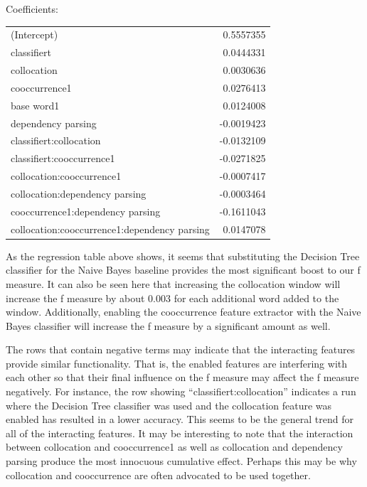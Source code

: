 \documentclass{article}
\begin{document}
Coefficients:

\begin{tabular}{l r}
                                (Intercept) & 0.5557355 \\
                                classifiert & 0.0444331  \\
                                 collocation & 0.0030636  \\
                              cooccurrence1 & 0.0276413 \\
                                 base word1 & 0.0124008  \\
                         dependency parsing & -0.0019423 \\
                     classifiert:collocation & -0.0132109 \\
                  classifiert:cooccurrence1 & -0.0271825 \\
                   collocation:cooccurrence1 & -0.0007417 \\
              collocation:dependency parsing & -0.0003464 \\
           cooccurrence1:dependency parsing & -0.1611043 \\
collocation:cooccurrence1:dependency parsing & 0.0147078  \\
\end{tabular}

As the regression table above shows, it seems that substituting the
Decision Tree classifier for the Naive Bayes baseline provides the
most significant boost to our f measure. It can also be seen here that
increasing the collocation window will increase the f measure by about 0.003
for each additional word added to the window. Additionally, enabling
the cooccurrence feature extractor with the Naive Bayes classifier
will increase the f measure by a significant amount as well.

The rows that contain negative terms may indicate that the interacting
features provide similar functionality. That is, the enabled features
are interfering with each other so that their final influence on the f
measure may affect the f measure negatively. For instance, the row
showing ``classifiert:collocation'' indicates a run where the Decision
Tree classifier was used and the collocation feature was enabled has
resulted in a lower accuracy. This seems to be the general trend for
all of the interacting features. It may be interesting to note that
the interaction between collocation and cooccurrence1 as well as
collocation and dependency parsing produce the most innocuous
cumulative effect. Perhaps this may be why collocation and
cooccurrence are often advocated to be used together.
\end{document}

